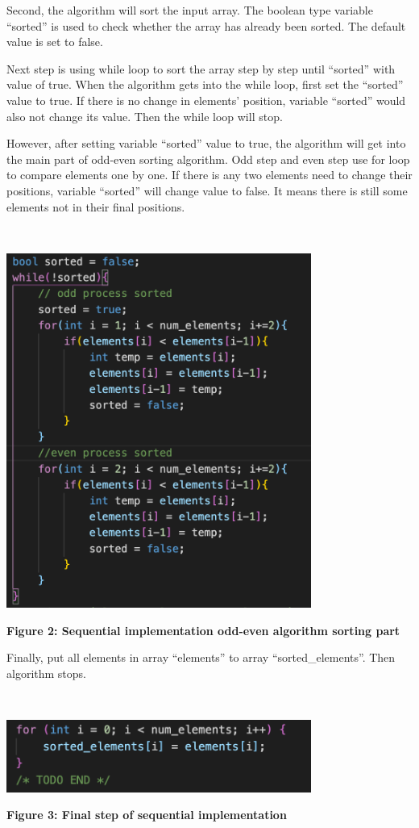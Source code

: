 Second, the algorithm will sort the input array. The boolean type variable “sorted” is used to check whether the array has already been sorted. The default value is set to false. 

Next step is using while loop to sort the array step by step until “sorted” with value of true. When the algorithm gets into the while loop, first set the “sorted” value to true. If there is no change in elements’ position, variable “sorted” would also not change its value. Then the while loop will stop. 

However, after setting variable “sorted” value to true, the algorithm will get into the main part of odd-even sorting algorithm. Odd step and even step use for loop to compare elements one by one. If there is any two elements need to change their positions, variable “sorted” will change value to false. It means there is still some elements not in their final positions.

~\\
\centerline {\includegraphics[scale = 1, width=10cm]{seq_imp}}
\centerline{\textbf {Figure 2: Sequential implementation odd-even algorithm sorting part}}

Finally, put all elements in array “elements” to array “sorted\_elements”. Then algorithm stops.

~\\
\centerline {\includegraphics[scale = 1, width=10cm]{seq_final}}
\centerline{\textbf {Figure 3: Final step of sequential implementation}}

